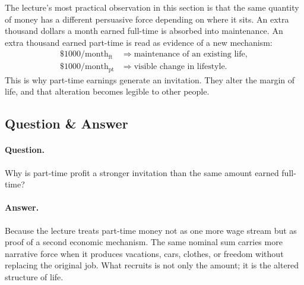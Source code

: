\begin{figure}[h]
\centering
{}
\end{figure}

The lecture's most practical observation in this section is that the same quantity of money has a different persuasive force depending on where it sits. An extra thousand dollars a month earned full-time is absorbed into maintenance. An extra thousand earned part-time is read as evidence of a new mechanism:
\begin{align}
\$1000/\text{month}_{\mathrm{ft}} &\Rightarrow \text{maintenance of an existing life},\\
\$1000/\text{month}_{\mathrm{pt}} &\Rightarrow \text{visible change in lifestyle}.
\end{align}
This is why part-time earnings generate an invitation. They alter the margin of life, and that alteration becomes legible to other people.

\subsection{Question \& Answer}

\paragraph{Question.} Why is part-time profit a stronger invitation than the same amount earned full-time?

\paragraph{Answer.} Because the lecture treats part-time money not as one more wage stream but as proof of a second economic mechanism. The same nominal sum carries more narrative force when it produces vacations, cars, clothes, or freedom without replacing the original job. What recruits is not only the amount; it is the altered structure of life.

